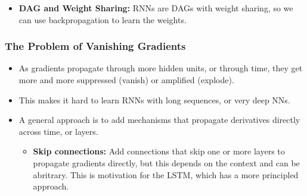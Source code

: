 \begin{warning}
    \begin{itemize}
        \item \textbf{DAG and Weight Sharing:} RNNs are DAGs with weight sharing, so we can use backpropagation to learn the weights.
    \end{itemize}
\end{warning}

\subsubsection{The Problem of Vanishing Gradients}
\begin{summary}
    \begin{itemize}
        \item As gradients propagate through more hidden units, or through time, they get more and more suppressed (vanish) or amplified (explode).
        \item This makes it hard to learn RNNs with long sequences, or very deep NNs.
        \item A general approach is to add mechanisms that propagate derivatives directly across time, or layers.
        \begin{itemize}
            \item \textbf{Skip connections:} Add connections that skip one or more layers to propagate gradients directly, but this depends on the context and can be abritrary. This is motivation for the LSTM, which has a more principled approach.
        \end{itemize}
    \end{itemize}  
\end{summary}

